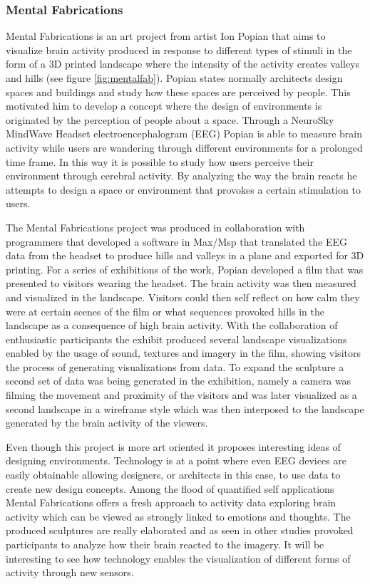 \documentclass[../medieninformatik-arbeit.tex]{subfiles}
\begin{document}
\subsubsection{Mental Fabrications}
\label{sub:mentalfabrications}
Mental Fabrications is an art project from artist Ion Popian \cite{mental2014fabrications} that aims to visualize brain activity produced in response to different types of stimuli in the form of a 3D printed landscape where the intensity of the activity creates valleys and hills (see figure \ref{fig:mentalfab}). Popian states normally architects design spaces and buildings and study how these spaces are perceived by people. This motivated him to develop a concept where the design of environments is originated by the perception of people about a space. Through a NeuroSky MindWave Headset \cite{nuero2015sky} electroencephalogram (EEG) Popian is able to measure brain activity while users are wandering through different environments for a prolonged time frame. In this way it is possible to study how users perceive their environment through cerebral activity. By analyzing the way the brain reacts he attempts to design a space or environment that provokes a certain stimulation to users.  

The Mental Fabrications project was produced in collaboration with programmers that developed a software in Max/Msp \cite{cylcing2015maxsmp} that translated the EEG data from the headset to produce hills and valleys in a plane and exported for 3D printing.
For a series of exhibitions of the work, Popian developed a film that was presented to visitors wearing the headset. The brain activity was then measured and visualized in the landscape. Visitors could then self reflect on how calm they were at certain scenes of the film or what sequences provoked hills in the landscape as a consequence of high brain activity. With the collaboration of enthusiastic participants the exhibit produced several landscape visualizations enabled by the usage of sound, textures and imagery in the film, showing visitors the process of generating visualizations from data. To expand the sculpture a second set of data was being generated in the exhibition, namely a camera was filming the movement and proximity of the visitors and was later visualized as a second landscape in a wireframe style which was then interposed to the landscape generated by the brain activity of the viewers.

Even though this project is more art oriented it proposes interesting ideas of designing environments. Technology is at a point where even EEG devices are easily obtainable allowing designers, or architects in this case, to use data to create new design concepts. Among the flood of quantified self applications Mental Fabrications offers a fresh approach to activity data exploring brain activity which can be viewed as strongly linked to emotions and thoughts. The produced sculptures are really elaborated and as seen in other studies provoked participants to analyze how their brain reacted to the imagery. It will be interesting to see how technology enables the visualization of different forms of activity through new sensors. 
\end{document}
